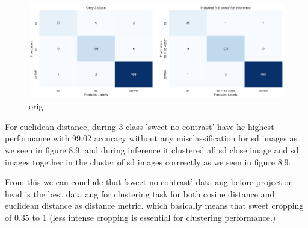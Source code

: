 \begin{table}[H]
    \centering
    \caption{Evaluation Results on Euclidean}
    \label{tab:professional_table}
\end{table}

\begin{figure}[H]
    \centering
    \includegraphics[scale=0.37]{figures/econfuse.png} 
    \caption{orig}
    \label{fig:econfuse.png}
\end{figure}


For euclidean distance, during 3 class 'sweet no contrast' have he highest performance with 99.02 accuracy without any misclassification for sd images as we seen 
in figure 8.9. and during inference it clustered all sd close image and sd images together in the cluster of sd images corrrectly as we seen in figure 8.9.


From this we can conclude that 'sweet no contrast' data aug before projection head is the best data aug for clustering task for both
 cosine distance and euclidean distance as distance metric. which basically means that sweet cropping of 0.35 to 1 (less intense cropping is essential for clustering performance.)




